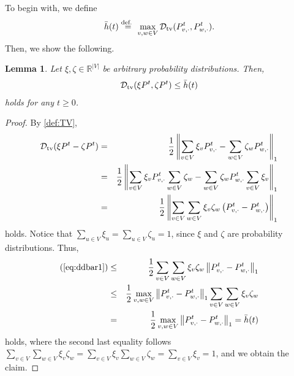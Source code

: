 \documentclass[letter, 11pt]{article}
\newcommand{\defeq}{\stackrel{\mbox{\scriptsize{\normalfont\rmfamily def. }}}{=}}
\newcommand{\1}{\mbox{1}\hspace{-0.25em}\mbox{l}}
\newtheorem{lemma}[theorem]{Lemma}
\begin{document}
To begin with, we define 
\begin{eqnarray}
\label{def:dbt}
\bar{h} (t)\defeq \max_{v, w\in V}\dtv(P^t_{v, \cdot}, P^t_{w, \cdot}). 
\end{eqnarray}
Then, we show the  following. 
\begin{lemma}
\label{lemm:dbarp}
Let $\xi, \zeta\in \mathbb{R}^{|V|}$ be arbitrary probability distributions. 
Then, 
\begin{eqnarray*}
{\cal D}_{\rm tv}(\xi P^t, \zeta P^t) \leq \bar{h}(t)
\end{eqnarray*}
holds for any $t\geq 0$. 
\end{lemma} 
\begin{proof}
By \eqref{def:TV}, 
\begin{eqnarray}
\label{eq:ddbar1}
{\cal D}_{\rm tv}(\xi P^t-\zeta P^t)
&=&\frac{1}{2}\left \|\sum_{v\in V}\xi_v P^t_{v, \cdot} -\sum_{w\in V}\zeta_w P^t_{w, \cdot} \right \|_{1} \nonumber \\
&=&\frac{1}{2}\left \|\sum_{v\in V}\xi_v P^t_{v, \cdot}\sum_{w\in V}\zeta_w -\sum_{w\in V}\zeta_w P^t_{w, \cdot}\sum_{v\in V}\xi_v \right \|_{1} \nonumber \\
&=&\frac{1}{2}\left \|\sum_{v\in V}\sum_{w\in V}\xi_v \zeta_w\left( P^t_{v, \cdot}- P^t_{w, \cdot}\right)\right \|_{1}
\end{eqnarray}
holds. Notice that 
  $\sum_{u\in V}\xi_u=\sum_{u\in V}\zeta_u=1$, since $\xi$ and $\zeta$ are probability distributions. 
Thus, 
\begin{eqnarray*}
(\ref{eq:ddbar1})
&\leq &\frac{1}{2}\sum_{v\in V}\sum_{w\in V}\xi_v \zeta_w\left \|P^t_{v, \cdot}- P^t_{w, \cdot}\right \|_{1} \nonumber \\
&\leq &\frac{1}{2}\max_{v, w\in V}\left \|P^t_{v, \cdot}- P^t_{w, \cdot}\right \|_{1}\sum_{v\in V}\sum_{w\in V}\xi_v \zeta_w \\
&=& \frac{1}{2}\max_{v, w\in V}\left \|P^t_{v, \cdot}- P^t_{w, \cdot}\right \|_{1}=\bar{h}(t)
\end{eqnarray*}
holds, where the second last equality follows $\sum_{v\in V}\sum_{w\in V}\xi_v \zeta_w=\sum_{v\in V}\xi_v\sum_{w\in V}\zeta_w=\sum_{v\in V}\xi_v=1$, and we obtain the claim. 
\end{proof}
\end{document}
